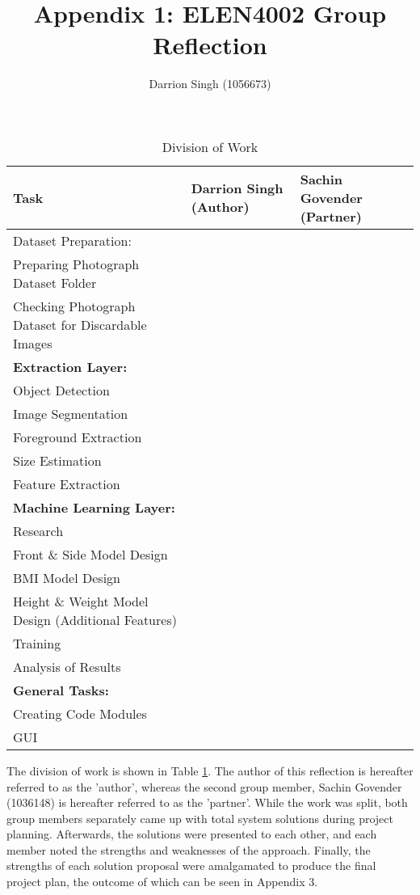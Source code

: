 \documentclass[conference, onecolumn]{IEEEtran}
\title{Appendix 1: ELEN4002 Group Reflection}
\author{Darrion Singh (1056673)}
\newcommand{\cmark}{\ding{51}}
\begin{document}
\maketitle
\vspace{-12pt}
\begin{table}[h]
\centering
\caption{Division of Work}
\label{division}
\begin{tabular}{|l|l|l|}
\hline
\textbf{Task} & \textbf{Darrion Singh (Author)} & \textbf{Sachin Govender (Partner)} \\ \hline
\multicolumn{3}{|l|}{Dataset Preparation:} \\ \hline
Preparing Photograph Dataset Folder & \cmark & \cmark \\ \hline
Checking Photograph Dataset for Discardable Images & \cmark & \cmark \\ \hline
\multicolumn{3}{|l|}{\textbf{Extraction Layer:}} \\ \hline
Object Detection & \cmark &  \\ \hline
Image Segmentation & \cmark &  \\ \hline
Foreground Extraction & \cmark &  \\ \hline
Size Estimation & \cmark &  \\ \hline
Feature Extraction & \cmark &  \\ \hline
\multicolumn{3}{|l|}{\textbf{Machine Learning Layer:}} \\ \hline
Research &  & \cmark \\ \hline
Front \& Side Model Design &  & \cmark \\ \hline
BMI Model Design &  & \cmark \\ \hline
Height \& Weight Model Design (Additional Features) &  & \cmark \\ \hline
Training & \cmark & \cmark \\ \hline
Analysis of Results &  & \cmark \\ \hline
\multicolumn{3}{|l|}{\textbf{General Tasks:}} \\ \hline
Creating Code Modules & \cmark &  \\ \hline
GUI & \cmark &  \\ \hline
\end{tabular}
\end{table}    

\vspace{6pt}

The division of work is shown in Table \ref{division}.
The author of this reflection is hereafter referred to as the 'author', whereas the second group member, Sachin Govender (1036148) is hereafter referred to as the 'partner'.
While the work was split, both group members separately came up with total system solutions during project planning.
Afterwards, the solutions were presented to each other, and each member noted the strengths and weaknesses of the approach.
Finally, the strengths of each solution proposal were amalgamated to produce the final project plan, the outcome of which can be seen in Appendix 3.
\end{document}
